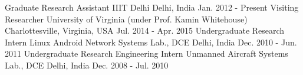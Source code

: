 \begin{cventries}
  \cventry
    {Graduate Research Assistant}
    {IIIT Delhi}
    {Delhi, India}
    {Jan. 2012 - Present}
    {}
  \cventry
    {Visiting Researcher}
    {University of Virginia (under Prof. Kamin Whitehouse)}
    {Charlottesville, Virginia, USA}
    {Jul. 2014 - Apr. 2015}
    {}
  \cventry
    {Undergraduate Research Intern}
    {Linux Android Network Systems Lab., DCE}
    {Delhi, India}
    {Dec. 2010 - Jun. 2011}
    {}
  \cventry
    {Undergraduate Research Engineering Intern}
    {Unmanned Aircraft Systems Lab., DCE}
    {Delhi, India}
    {Dec. 2008 - Jul. 2010}
    {}
 
  
\end{cventries}
